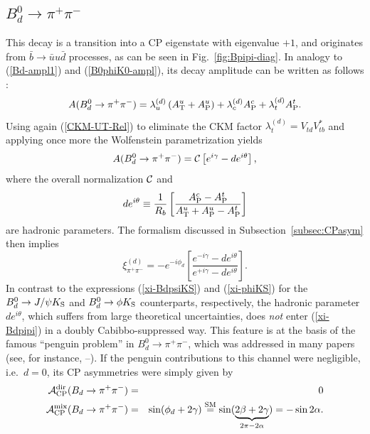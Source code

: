 \documentclass[12pt]{article}
\begin{document}
%
%
%
\boldmath
\subsection{$B^0_d\to \pi^+\pi^-$}\label{ssec:Bpi+pi-}
\unboldmath
%
%
%
This decay is a transition into a CP eigenstate with eigenvalue $+1$, and 
originates from $\bar b\to\bar u u \bar d$ processes, as can be seen in 
Fig.~\ref{fig:Bpipi-diag}. In analogy to (\ref{Bd-ampl1}) and (\ref{B0phiK0-ampl}), 
its decay amplitude can be written as follows \cite{RF-BsKK}:
\begin{equation}
A(B_d^0\to\pi^+\pi^-)=
\lambda_u^{(d)}\left(A_{\rm T}^{u}+
A_{\rm P}^{u}\right)+\lambda_c^{(d)}A_{\rm P}^{c}+
\lambda_t^{(d)}A_{\rm P}^{t}.
\end{equation}
Using again (\ref{CKM-UT-Rel}) to eliminate the CKM factor 
$\lambda_t^{(d)}=V_{td}V_{tb}^\ast$ and applying once more the 
Wolfenstein parametrization yields
\begin{equation}\label{Bpipi-ampl}
A(B_d^0\to\pi^+\pi^-)={\cal C}\left[e^{i\gamma}-de^{i\theta}\right],
\end{equation}
where the overall normalization ${\cal C}$ and
\begin{equation}\label{D-DEF}
d e^{i\theta}\equiv\frac{1}{R_b}
\left[\frac{A_{\rm P}^{c}-A_{\rm P}^{t}}{A_{\rm T}^{u}+
A_{\rm P}^{u}-A_{\rm P}^{t}}\right]
\end{equation}
are hadronic parameters. 
The formalism discussed in Subsection~\ref{subsec:CPasym} then implies 
\begin{equation}\label{xi-Bdpipi}
\xi_{\pi^+\pi^-}^{(d)}=-e^{-i\phi_d}\left[\frac{e^{-i\gamma}-
d e^{i\theta}}{e^{+i\gamma}-d e^{i\theta}}\right].
\end{equation}
In contrast to the expressions (\ref{xi-BdpsiKS}) and (\ref{xi-phiKS}) 
for the $B_d^0\to J/\psi K_{\rm S}$ and $B^0_d\to\phi K_{\rm S}$ counterparts,
respectively, the hadronic parameter $d e^{i\theta}$, which suffers from large 
theoretical uncertainties, does {\it not} enter  (\ref{xi-Bdpipi}) 
in a doubly Cabibbo-suppressed way. This feature is at the basis of the
famous ``penguin problem'' in $B^0_d\to\pi^+\pi^-$, which was addressed
in many papers (see, for instance, \cite{GL}--\cite{GLSS}). If the penguin 
contributions to this channel were negligible, i.e.\ $d=0$, its CP asymmetries 
were simply given by
\begin{eqnarray}
{\cal A}_{\rm CP}^{\rm dir}(B_d\to\pi^+\pi^-)&=&0 \\
{\cal A}_{\rm CP}^{\rm mix}(B_d\to\pi^+\pi^-)&=&\sin(\phi_d+2\gamma)
\stackrel{\rm SM}{=}\sin(\underbrace{2\beta+2\gamma}_{2\pi-2\alpha})
=-\sin 2\alpha.
\end{eqnarray}
\end{document}
